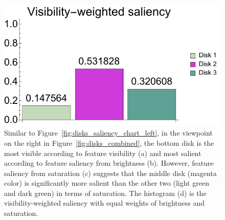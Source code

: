 \begin{figure}
\begin{minipage}{.45\textwidth}
		\subcaption{}
	\end{minipage}~
	\begin{minipage}{.45\textwidth}
		\includegraphics[width=1\linewidth]{figures/disk_visibility_saliency_weighted_chart_right}
		\subcaption{}
	\end{minipage}
	\caption[The feature visibility histogram and the visiblity-weighted saliency histograms from the right viewpoint]{Similar to Figure~\ref{fig:disks_saliency_chart_left}, in the viewpoint on the right in Figure~\ref{fig:disks_combined}, the bottom disk is the most visible according to feature visibility (a) and most salient according to feature saliency from brightness (b). However, feature saliency from saturation (c) suggests that the middle disk (magenta color) is significantly more salient than the other two (light green and dark green) in terms of saturation. The histogram (d) is the visibility-weighted saliency with equal weights of brightness and saturation.}
	\label{fig:disks_saliency_chart_right}
\end{figure}


